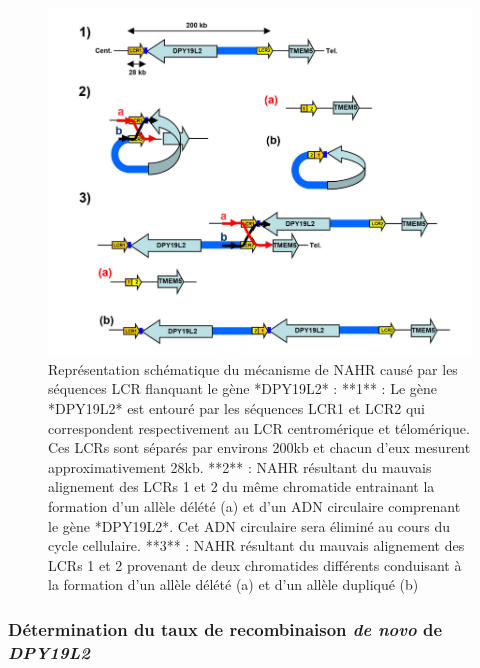 \documentclass[12pt,twoside]{reedthesis}
\theoremstyle{definition}
\theoremstyle{definition}
\theoremstyle{remark}
\begin{document}
  \newpage
  
  \begin{figure}
  
  {\centering \includegraphics[scale=0.5]{figure/dpy_nahr} 
  
  }
  
  \caption[Représentation schématique du mécanisme de NAHR causé par les séquences LCR flanquant le gène *DPY19L2*]{Représentation schématique du mécanisme de NAHR causé par les séquences LCR flanquant le gène *DPY19L2* : **1** : Le gène *DPY19L2* est entouré par les séquences LCR1 et LCR2 qui correspondent respectivement au LCR centromérique et télomérique. Ces LCRs sont séparés par environs 200kb et chacun d'eux mesurent approximativement 28kb. **2** : NAHR résultant du mauvais alignement des LCRs 1 et 2 du même chromatide entrainant la formation d'un allèle délété (a) et d'un ADN circulaire comprenant le gène *DPY19L2*. Cet ADN circulaire sera éliminé au cours du cycle cellulaire. **3** : NAHR résultant du mauvais alignement des LCRs 1 et 2 provenant de deux chromatides différents conduisant à la formation d'un allèle délété (a) et d'un allèle dupliqué (b)}\label{fig:nahr}
  \end{figure}
  
  \subsubsection{\texorpdfstring{Détermination du taux de recombinaison
  \emph{de novo} de
  \emph{DPY19L2}}{Détermination du taux de recombinaison de novo de DPY19L2}}\label{determination-du-taux-de-recombinaison-de-novo-de-dpy19l2}
  
\end{document}
